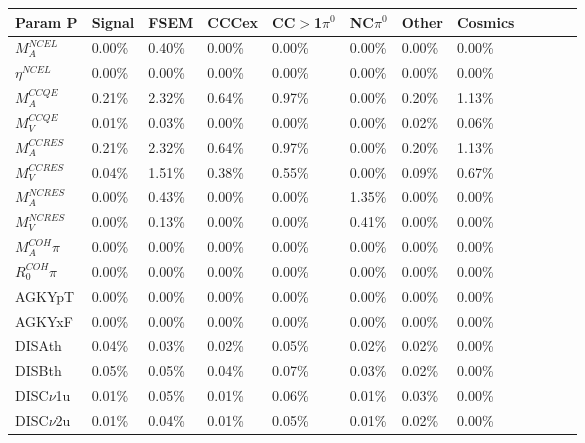 \documentclass{article}
\begin{document}
\begin{table*}
\centering
{}
 \begin{tabular}{| l | l | l | l | l | l | l | l | l | l | l | l | }
 \hline
  Param P &Signal& FSEM & CCCex & CC$>$1$\pi^0$ & NC$\pi^0$& Other & Cosmics \\ [0.1ex] \hline
$M_A^{NCEL}$ & 0.00\% &  0.40\% &  0.00\% &  0.00\% &  0.00\% &  0.00\% &  0.00\%   \\
$\eta^{NCEL}$  &0.00\% &  0.00\% &  0.00\% &  0.00\% &  0.00\% &  0.00\% &  0.00\%  \\
$M_A^{CCQE}$  & 0.21\% &  2.32\% &  0.64\% &  0.97\% &  0.00\% &  0.20\% &  1.13\% \\
$M_V^{CCQE}$  & 0.01\% &  0.03\% &  0.00\% &  0.00\% &  0.00\% &  0.02\% &  0.06\% \\
$M_A^{CCRES}$  & 0.21\% &  2.32\% &  0.64\% &  0.97\% &  0.00\% &  0.20\% &  1.13\% \\
$M_V^{CCRES}$ & 0.04\% &  1.51\% &  0.38\% &  0.55\% &  0.00\% &  0.09\% &  0.67\% \\
$M_A^{NCRES}$ & 0.00\% &  0.43\% &  0.00\% &  0.00\% &  1.35\% &  0.00\% &  0.00\%  \\
$M_V^{NCRES}$ &0.00\% &  0.13\% &  0.00\% &  0.00\% &  0.41\% &  0.00\% &  0.00\%\\
$M_A^{COH}\pi$ & 0.00\% &  0.00\% &  0.00\% &  0.00\% &  0.00\% &  0.00\% &  0.00\% \\
$R_0^{COH}\pi$ & 0.00\% &  0.00\% &  0.00\% &  0.00\% &  0.00\% &  0.00\% &  0.00\% \\

AGKYpT & 0.00\% &  0.00\% &  0.00\% &  0.00\% &  0.00\% &  0.00\% &  0.00\% \\ %
AGKYxF & 0.00\% &  0.00\% &  0.00\% &  0.00\% &  0.00\% &  0.00\% &  0.00\% \\ %
DISAth & 0.04\% &  0.03\% &  0.02\% &  0.05\% &  0.02\% &  0.02\% &  0.00\% \\ %
DISBth & 0.05\% &  0.05\% &  0.04\% &  0.07\% &  0.03\% &  0.02\% &  0.00\%  \\ %
DISC$\nu$1u & 0.01\% &  0.05\% &  0.01\% &  0.06\% &  0.01\% &  0.03\% &  0.00\%\\ %
DISC$\nu$2u & 0.01\% &  0.04\% &  0.01\% &  0.05\% &  0.01\% &  0.02\% &  0.00\% \\ \hline


\end{tabular}
\end{table*}
\end{document}
